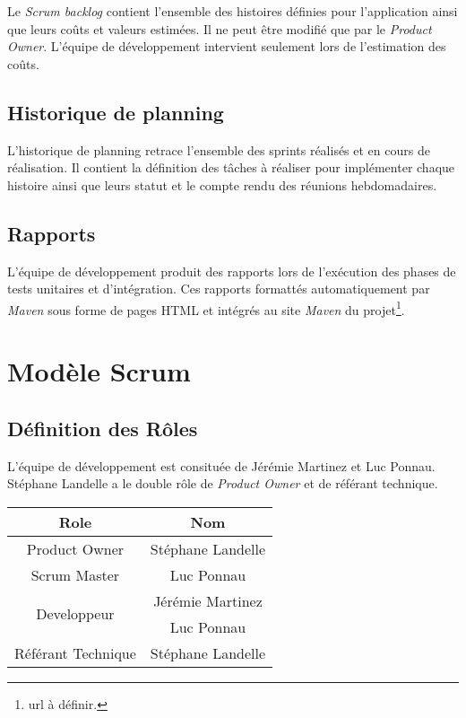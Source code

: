 \documentclass[11pt]{article}
\begin{document}
Le \emph{Scrum backlog} contient l'ensemble des histoires définies pour
l'application ainsi que leurs coûts et valeurs estimées. Il ne peut être modifié
que par le \emph{Product Owner}. L'équipe de développement intervient seulement
lors de l'estimation des coûts.

\subsection{Historique de planning}

L'historique de planning retrace l'ensemble des sprints réalisés et en cours de
réalisation. Il contient la définition des tâches à réaliser pour implémenter
chaque histoire ainsi que leurs statut et le compte rendu des réunions
hebdomadaires.

\subsection{Rapports}

L'équipe de développement produit des rapports lors de l'exécution des phases
de tests unitaires et d'intégration. Ces rapports formattés automatiquement
par \emph{Maven} sous forme de pages HTML et intégrés au site \emph{Maven} du
projet\footnote{url à définir.}.

\section{Modèle Scrum}

\subsection{Définition des Rôles}

L'équipe de développement est consituée de Jérémie Martinez et Luc Ponnau.
Stéphane Landelle a le double rôle de \emph{Product Owner} et de référant 
technique.

\begin{center}
\begin{tabular}{ | c | c | }
\hline \textbf{Role} & \textbf{Nom} \\
\hline Product Owner & Stéphane Landelle \\
\hline Scrum Master & Luc Ponnau \\
\hline \multirow{2}{*}{Developpeur} & Jérémie Martinez \\ & Luc Ponnau \\
\hline Référant Technique & Stéphane Landelle \\ \hline
\end{tabular}
\end{center}
\end{document}

